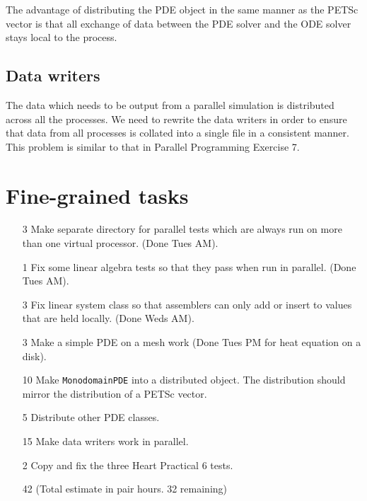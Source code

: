 \documentclass{article}
\begin{document}
The advantage of distributing the PDE object in the same manner as the
PETSc vector is that all exchange of data between the PDE solver and
the ODE solver stays local to the process.

\subsection{Data writers}

The data which needs to be output from a parallel simulation is
distributed across all the processes. We need to rewrite the data
writers in order to ensure that data from all processes is collated
into a single file in a consistent manner.  This problem is similar to
that in Parallel Programming Exercise 7.

\section{Fine-grained tasks}

\begin{itemize}
\item[3]
Make separate directory for parallel tests which are always run on
more than one virtual processor.  (Done Tues AM).
\item[1]
Fix some linear algebra tests so that they pass when run in
parallel. (Done Tues AM). 
\item[3] 
Fix linear system class so that assemblers can only add or insert to
values that are held locally. (Done Weds AM).
\item[3]
Make a simple PDE on a mesh work (Done Tues PM for heat equation on a disk).
\item[10]
Make {\tt MonodomainPDE} into a distributed object. The distribution
should mirror the distribution of a PETSc vector.
\item[5]
Distribute other PDE classes.
\item[15]
Make data writers work in parallel.
\item[2] 
Copy and fix the three Heart Practical 6 tests.
\item[42] (Total estimate in pair hours.  32 remaining)
\end{itemize}
\end{document}
